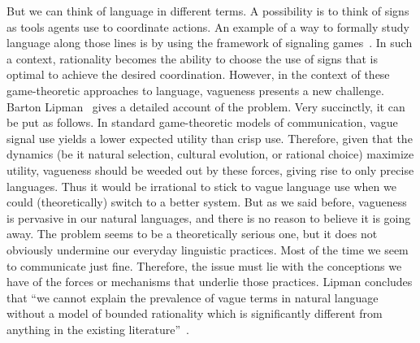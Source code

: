 \documentclass[a4paper]{article}
\begin{document}
But we can think of language in different terms.
A possibility is to think of signs as tools agents use to coordinate actions.
An example of a way to formally study language along those lines is by using the framework of signaling games~\parencite{lewis_convention_1969}.
In such a context, rationality becomes the ability to choose the use of signs that is optimal to achieve the desired coordination.
However, in the context of these game-theoretic approaches to language, vagueness presents a new challenge.
Barton Lipman~\parencite*{lipman_why_2009} gives a detailed account of the problem.
Very succinctly, it can be put as follows.
In standard game-theoretic models of communication, vague signal use yields a lower expected utility than crisp use.
Therefore, given that the dynamics (be it natural selection, cultural evolution, or rational choice) maximize utility, vagueness should be weeded out by these forces, giving rise to only precise languages.
Thus it would be irrational to stick to vague language use when we could (theoretically) switch to a better system.
But as we said before, vagueness is pervasive in our natural languages, and there is no reason to believe it is going away.
The problem seems to be a theoretically serious one, but it does not obviously undermine our everyday linguistic practices.
Most of the time we seem to communicate just fine.
Therefore, the issue must lie with the conceptions we have of the forces or mechanisms that underlie those practices.
Lipman concludes that ``we cannot explain the prevalence of vague terms in natural language without a model of bounded rationality which is significantly different from anything in the existing literature''~\parencite*[1]{lipman_why_2009}.
\end{document}

